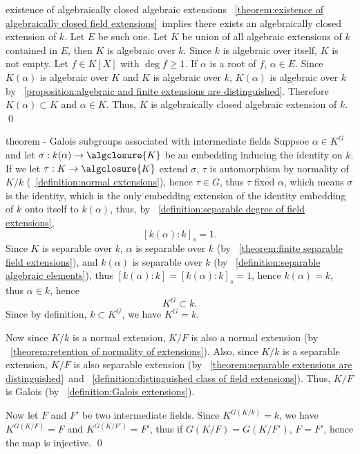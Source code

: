 \documentclass[17pt,landscape]{foils}
\begin{document}
{{{\begin{myproof}{existence of algebraically closed algebraic extensions}
	\theoremname~\ref{theorem:existence of algebraically closed field extensions}\
	implies there exists an algebraically closed extension of $k$.
	Let $E$ be such one.
	Let $K$ be union of all algebraic extensions of $k$ contained in $E$,
	then $K$ is algebraic over $k$.
	Since $k$ is algebraic over itself, $K$ is not empty.
	Let $f\in K[X]$ with $\deg f\geq1$.
	If $\alpha$ is a root of $f$, $\alpha \in E$.
	Since $K(\alpha)$ is algebraic over $K$ and $K$ is algebraic over $k$,
	$K(\alpha)$ is algebraic over $k$ by \propositionname~\ref{proposition:algebraic and finite extensions are distinguished}.
	Therefore $K(\alpha)\subset K$ and $\alpha \in K$.
	Thus, $K$ is algebraically closed algebraic extension of $k$.
	\qed\
\end{myproof}

\begin{myproof}{theorem - Galois subgroups associated with intermediate fields}
	Suppsoe $\alpha\in K^G$
	and let $\sigma:k(\alpha) \to \algclosure{K}$
	be an embedding inducing the identity on $k$.
	If we let $\tau:K\to\algclosure{K}$ extend $\sigma$,
	$\tau$ is automorphism
	by normality of $K/k$ (\definitionname~\ref{definition:normal extensions}),
	hence $\tau\in G$, thus $\tau$ fixed $\alpha$,
	which means $\sigma$ is the identity, which is the only embedding extension
	of the identity embedding of $k$ onto itself to $k(\alpha)$,
	thus, by \definitionname~\ref{definition:separable degree of field extensions},
	$$
		[k(\alpha):k]_s = 1.
	$$
	Since $K$ is separable over $k$, $\alpha$ is separable over $k$ (by \theoremname~\ref{theorem:finite separable field extensions}),
	and $k(\alpha)$ is separable over $k$ (by ~\ref{definition:separable algebraic elements}),
	thus $[k(\alpha):k] = [k(\alpha):k]_s = 1$, hence $k(\alpha)=k$, thus $\alpha\in k$,
	hence
	$$
		K^G \subset k.
	$$
	Since by definition, $k\subset K^G$, we have $K^G = k$.

	Now since $K/k$ is a normal extension, $K/F$ is also a normal extension
	(by \theoremname~\ref{theorem:retention of normality of extensions}).
	Also, since $K/k$ is a separable extension,
	$K/F$ is also separable extension
	(by \theoremname~\ref{theorem:separable extensions are distinguished}\ and ~\ref{definition:distinguished class of field extensions}).
	Thus, $K/F$ is Galois (by ~\ref{definition:Galois extensions}).

	Now let $F$ and $F'$ be two intermediate fields. Since $K^{G(K/k)}= k$,
	we have $K^{G(K/F)}=F$ and $K^{G(K/F')}=F'$,
	thus if ${G(K/F)}={G(K/F')}$,
	$F=F'$,
	hence the map is injective.
	\qed
\end{myproof}

}}}
\end{document}
